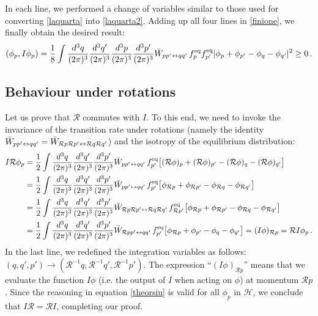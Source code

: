 \documentclass[a4paper, amsfonts, amssymb, amsmath, reprint, showkeys, nofootinbib, twoside, onecolumn,notitlepage]{revtex4-2}
\theoremstyle{definition}
\theoremstyle{theorem}
\theoremstyle{corollary}
\begin{document}
In each line, we performed a change of variables similar to those used for converting \eqref{laquarta} into \eqref{laquarta2}. Adding up all four lines in \eqref{finione}, we finally obtain the desired result:
\begin{equation}
(\phi_p,I\phi_p) =  \dfrac{1}{8} \int \dfrac{d^3 q}{(2\pi)^3} \dfrac{d^3 q'}{(2\pi)^3} \dfrac{d^3 p}{(2\pi)^3}\dfrac{d^3 p'}{(2\pi)^3}  \Bar{W}_{pp'\leftrightarrow qq'} \,  f^{\text{eq}}_{p} f^{\text{eq}}_{p'} |\phi_p+\phi_{p'}-\phi_q-\phi_{q'}|^2 \geq 0 \, . 
\end{equation}



\subsection{Behaviour under rotations}\label{ououritazia}

Let us prove that $\mathcal{R}$ commutes with $I$.
To this end, we need to invoke the invariance of the transition rate under rotations (namely the identity $\Bar{W}_{pp'\leftrightarrow qq'}=\Bar{W}_{\mathcal{R}p\mathcal{R}p'\leftrightarrow \mathcal{R}q \mathcal{R}q'}$) and the isotropy of the equilibrium distribution:
\begin{equation}\label{theorsiu}
\begin{split}
I  \mathcal{R} \phi_p={}& \dfrac{1}{2} \int \dfrac{d^3 q}{(2\pi)^3} \dfrac{d^3 q'}{(2\pi)^3} \dfrac{d^3 p'}{(2\pi)^3}  \Bar{W}_{pp'\leftrightarrow qq'} \,  f^{\text{eq}}_{p'}\big[(\mathcal{R}\phi)_p+(\mathcal{R}\phi)_{p'}-(\mathcal{R}\phi)_q-(\mathcal{R}\phi)_{q'}\big] \\
   ={}& \dfrac{1}{2} \int \dfrac{d^3 q}{(2\pi)^3} \dfrac{d^3 q'}{(2\pi)^3} \dfrac{d^3 p'}{(2\pi)^3}  \Bar{W}_{pp'\leftrightarrow qq'} \,  f^{\text{eq}}_{p'}\big[\phi_{\mathcal{R}p}+\phi_{\mathcal{R}p'}-\phi_{\mathcal{R}q}-\phi_{\mathcal{R}q'}\big] \\
   ={}& \dfrac{1}{2} \int \dfrac{d^3 q}{(2\pi)^3} \dfrac{d^3 q'}{(2\pi)^3} \dfrac{d^3 p'}{(2\pi)^3}  \Bar{W}_{\mathcal{R}p\mathcal{R}p'\leftrightarrow \mathcal{R}q \mathcal{R}q'} \,  f^{\text{eq}}_{\mathcal{R}p'}\big[\phi_{\mathcal{R}p}+\phi_{\mathcal{R}p'}-\phi_{\mathcal{R}q}-\phi_{\mathcal{R}q'}\big] \\
   ={}& \dfrac{1}{2} \int \dfrac{d^3 q}{(2\pi)^3} \dfrac{d^3 q'}{(2\pi)^3} \dfrac{d^3 p'}{(2\pi)^3}  \Bar{W}_{\mathcal{R}pp'\leftrightarrow qq'} \,  f^{\text{eq}}_{p'}\big[ \phi_{\mathcal{R}p}+\phi_{p'}-\phi_q-\phi_{q'}\big]= (I\phi)_{\mathcal{R}p}=\mathcal{R}I\phi_p \, . \\
   \end{split}
\end{equation}
In the last line, we redefined the integration variables as follows: $(q,q',p') \rightarrow (\mathcal{R}^{-1}q,\mathcal{R}^{-1}q',\mathcal{R}^{-1}p')$. The expression ``$(I\phi)_{\mathcal{R}p}$'' means that we evaluate the function $I\phi$ (i.e. the output of $I$ when acting on $\phi$) at momentum $\mathcal{R}p$. Since the reasoning in equation \eqref{theorsiu} is valid for all $\phi_p$ in $\mathcal{H}$, we conclude that $I \mathcal{R}=\mathcal{R}I$, completing our proof.









\label{lastpage}
\end{document}
